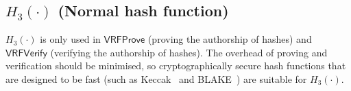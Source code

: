 \documentclass[sigconf]{acmart}
\begin{document}
\subsection{$H_{3}(\cdot)$ (Normal hash function)}

$H_{3}(\cdot)$ is only used in $\mathsf{VRFProve}$ (proving the authorship of hashes) and $\mathsf{VRFVerify}$ (verifying the authorship of hashes).
The overhead of proving and verification should be minimised, so cryptographically secure hash functions that are designed to be fast (such as Keccak~\cite{bertoni2013keccak} and BLAKE~\cite{aumasson2008sha}) are suitable for $H_{3}(\cdot)$.








\end{document}
